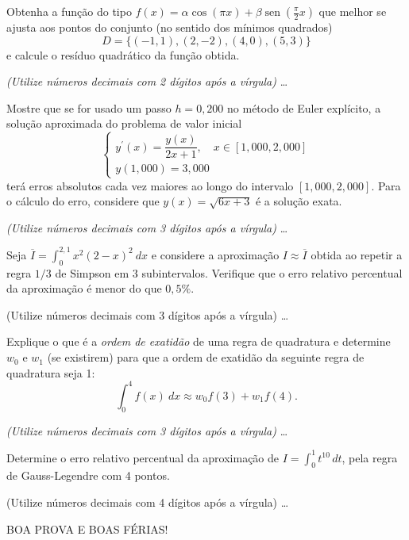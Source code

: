 \documentclass[12pt,a4paper]{article}
\begin{document}
\begin{ExerciseList}
\Exercise[title={2,5}]
Obtenha a função do tipo $f(x) = \alpha \cos(\pi x) + \beta \operatorname{sen}(\frac{\pi}{2} x)$ que melhor se ajusta aos pontos do conjunto (no sentido dos mínimos quadrados)
\[
D = \{(-1, 1), (2, -2), (4, 0), (5, 3)\}
\]
e calcule o resíduo quadrático da função obtida.

{\color{blue} \textit{(Utilize números decimais com 2 dígitos após a vírgula)}}
\Answer
\color{red}
\ldots


\Exercise[title={2,5}]
Mostre que se for usado um passo $h=0,200$ no método de Euler explícito, a solução aproximada do problema de valor inicial
\[
\begin{cases}
y^\prime(x) = \dfrac{y(x)}{2x + 1}, \quad x \in [1,000, 2,000]\\
y(1,000) = 3,000
\end{cases}
\]
terá erros absolutos cada vez maiores ao longo do intervalo $[1,000, 2,000]$. Para o cálculo do erro, considere que $y(x)=\sqrt{6x + 3}$ é a solução exata.

{\color{blue} \textit{(Utilize números decimais com 3 dígitos após a vírgula)}}
\Answer
\color{red}
\ldots


\Exercise[title={2,5}]
Seja $\overline{I} = \int_0^{2,1} x^2(2-x)^2\ dx$ e considere a aproximação $I \approx \overline{I}$ obtida ao repetir a regra $1/3$ de Simpson em $3$ subintervalos. Verifique que o erro relativo percentual da aproximação é menor do que $0,5\%$.

{\color{blue} (Utilize números decimais com 3 dígitos após a vírgula)}
\Answer
\color{red}
\ldots

\Exercise[title={2,5}]
Explique o que é a \textit{ordem de exatidão} de uma regra de quadratura e determine $w_0$ e $w_1$ (se existirem) para que a ordem de exatidão da seguinte regra de quadratura seja 1:
\[
\int_0^4 f(x)\ dx \approx w_0 f(3) + w_1 f(4).
\]

{\color{blue} \textit{(Utilize números decimais com 3 dígitos após a vírgula)}}
\Answer
\color{red}
\ldots



\Exercise[title={2,5}]
Determine o erro relativo percentual da aproximação de $I = \int_{0}^{1} t^{10} \, dt$, pela regra de Gauss-Legendre com 4 pontos.

{\color{blue} (Utilize números decimais com 4 dígitos após a vírgula)}
\Answer
\color{red}
\ldots

\end{ExerciseList}

\vfill
\begin{center}
BOA PROVA E BOAS FÉRIAS!
\end{center}


\end{document}
